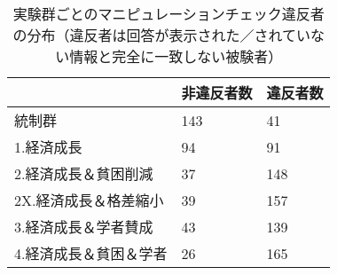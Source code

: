 \begin{table}[ht]
\centering
\caption{実験群ごとのマニピュレーションチェック違反者の分布（違反者は回答が表示された／されていない情報と完全に一致しない被験者）} 
\label{mchecktab_2}
\begin{tabular}{lll}
  \hline
 & 非違反者数 & 違反者数 \\ 
  \hline
統制群 & 143 &  41 \\ 
  1.経済成長 &  94 &  91 \\ 
  2.経済成長＆貧困削減 &  37 & 148 \\ 
  2X.経済成長＆格差縮小 &  39 & 157 \\ 
  3.経済成長＆学者賛成 &  43 & 139 \\ 
  4.経済成長＆貧困＆学者 &  26 & 165 \\ 
   \hline
\end{tabular}
\end{table}
